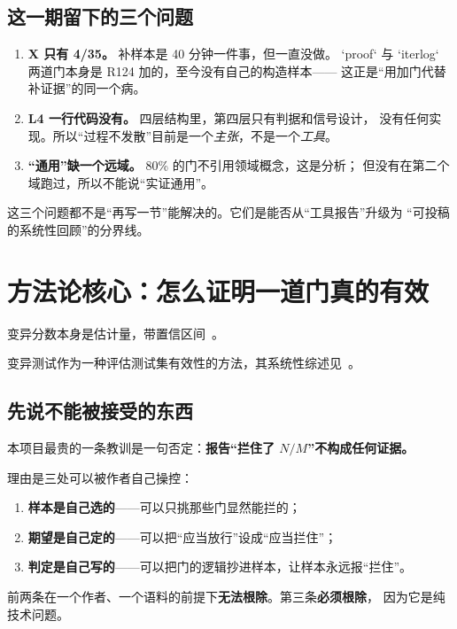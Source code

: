 \documentclass[11pt,a4paper]{article}
\begin{document}
\subsection{这一期留下的三个问题}

\begin{enumerate}[leftmargin=1.8em,itemsep=3pt]
\item \textbf{X 只有 4/35。} 补样本是 40 分钟一件事，但一直没做。
      `proof` 与 `iterlog` 两道门本身是 R124 加的，至今没有自己的构造样本——
      这正是“用加门代替补证据”的同一个病。
\item \textbf{L4 一行代码没有。} 四层结构里，第四层只有判据和信号设计，
      没有任何实现。所以“过程不发散”目前是一个\emph{主张}，不是一个\emph{工具}。
\item \textbf{“通用”缺一个远域。} 80\% 的门不引用领域概念，这是分析；
      但没有在第二个域跑过，所以不能说“实证通用”。
\end{enumerate}

这三个问题都不是“再写一节”能解决的。它们是能否从“工具报告”升级为
“可投稿的系统性回顾”的分界线。

\section{方法论核心：怎么证明一道门真的有效}\label{sec:mutation}

变异分数本身是估计量，带置信区间~\cite{ref2}。

变异测试作为一种评估测试集有效性的方法，其系统性综述见~\cite{ref1}。

\subsection{先说不能被接受的东西}
本项目最贵的一条教训是一句否定：\textbf{报告“拦住了 $N/M$”不构成任何证据。}

理由是三处可以被作者自己操控：
\begin{enumerate}[leftmargin=1.6em,itemsep=2pt]
\item \textbf{样本是自己选的}——可以只挑那些门显然能拦的；
\item \textbf{期望是自己定的}——可以把“应当放行”设成“应当拦住”；
\item \textbf{判定是自己写的}——可以把门的逻辑抄进样本，让样本永远报“拦住”。
\end{enumerate}

前两条在一个作者、一个语料的前提下\textbf{无法根除}。第三条\textbf{必须根除}，
因为它是纯技术问题。
\end{document}
